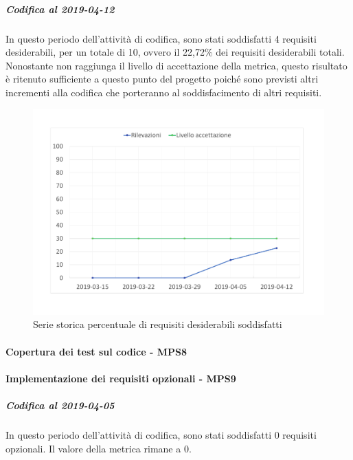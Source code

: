 \subparagraph{Codifica al 2019-04-12}
In questo periodo dell'attività di codifica, sono stati soddisfatti 4 requisiti desiderabili, per un totale di 10, ovvero il 22,72\% dei requisiti desiderabili totali.
Nonostante non raggiunga il livello di accettazione della
metrica, questo risultato è ritenuto sufficiente a questo punto del progetto poiché sono previsti altri incrementi alla codifica che porteranno al soddisfacimento di altri requisiti.
\begin{figure}[H]
	\centering
	\includegraphics[scale=0.6]{images/resoconto/MPS7Chart.pdf}
	\caption{Serie storica percentuale di requisiti desiderabili soddisfatti}	
\end{figure}

\paragraph{Copertura dei test sul codice - MPS8}

\paragraph{Implementazione dei requisiti opzionali - MPS9}
\subparagraph{Codifica al 2019-04-05}
In questo periodo dell'attività di codifica, sono stati soddisfatti 0 requisiti opzionali. Il valore della metrica rimane a 0.


